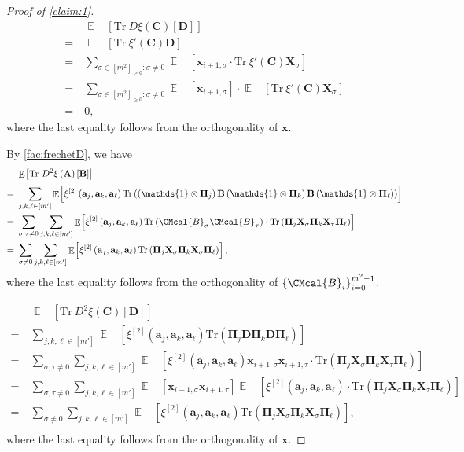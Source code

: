 \documentclass[11pt]{article}
\def\B{\CMcal{B}}
\theoremstyle{plain}
\theoremstyle{definition}
\newcommand {\minusspace} {\: \! \!}
\newcommand {\Fn} [2] {\ensuremath{ #1 \minusspace \Br{ #2 } }}
\newcommand {\set} [1] {\ensuremath{ \left\lbrace #1 \right\rbrace }}
\newcommand {\br} [1] {\ensuremath{ \left( #1 \right) }}
\newcommand {\Br} [1] {\ensuremath{ \left[ #1 \right] }}
\DeclareMathOperator*{\bigE}{\mathbb{E}}
\newcommand {\expec} [2] {\Fn{\bigE_{\substack{#1}}}{#2}}
\newcommand {\Tr} {\ensuremath{ \mathrm{Tr} }}
\newcommand {\id} {\ensuremath{\mathds{1}}}
\newcommand{\randx}{\ensuremath{\mathbf{x}}}
\newcommand{\randB}{\ensuremath{\mathbf{B}}}
\newcommand{\randC}{\ensuremath{\mathbf{C}}}
\newcommand{\randD}{\ensuremath{\mathbf{D}}}
\newcommand{\randa}{\ensuremath{\mathbf{a}}}
\newcommand{\randPi}{\ensuremath{\mathbf{\Pi}}}
\newcommand{\1}{\mathbb{1}} %
\begin{document}
\begin{proof}[Proof of \cref{claim:1}]
\begin{align*}
&\expec{}{\Tr~D\xi\br{\mathbf{C}}\Br{\mathbf{D}}}\\
=~&\expec{}{\Tr~\xi'\br{\randC}\randD}\\
=~&\sum_{\sigma\in[m^2]_{\geq 0}:\sigma\neq 0}\expec{}{\randx_{i+1,\sigma}\cdot\Tr~\xi'\br{\randC}\mathbf{X}_{\sigma}}\\
=~&\sum_{\sigma\in[m^2]_{\geq 0}:\sigma\neq 0}\expec{}{\randx_{i+1,\sigma}}\cdot\expec{}{\Tr~\xi'\br{\randC}\mathbf{X}_{\sigma}}\\
=~&0,
\end{align*}
where the last equality follows from the orthogonality of $\randx$.


By \cref{fac:frechetD}, we have 
\begin{align*}
&\expec{}{\Tr~D^2\xi\br{\mathbf{A}}\Br{\mathbf{B}}}\\
=~&\sum_{j,k,\ell\in[m']}\expec{}{\xi^{[2]}\br{\randa_j,\randa_k,\randa_{\ell}}\Tr\br{\br{\id\otimes\randPi_{j}}\randB\br{\id\otimes\randPi_{k}}\randB\br{\id\otimes\randPi_{\ell}}}}\\
=~&\sum_{\sigma,\tau\ne0}\sum_{j,k,\ell\in[m']}\expec{}{\xi^{[2]}\br{\randa_j,\randa_k,\randa_{\ell}}\Tr\br{\B_{\sigma}\B_{\tau}}\cdot\Tr\br{\randPi_{j}\mathbf{X}_{\sigma}\randPi_{k}\mathbf{X}_{\tau}\randPi_{\ell}}}\\
=~&\sum_{\sigma\ne0}\sum_{j,k,\ell\in[m']}\expec{}{\xi^{[2]}\br{\randa_j,\randa_k,\randa_{\ell}}\Tr\br{\randPi_{j}\mathbf{X}_{\sigma}\randPi_{k}\mathbf{X}_{\sigma}\randPi_{\ell}}},\\
\end{align*}
where the last equality follows from the orthogonality of $\set{\B_i}_{i=0}^{m^2-1}$.


\begin{align*}
&\expec{}{\Tr~D^2\xi\br{\mathbf{C}}\Br{\mathbf{D}}}\\
=~&\sum_{j,k,\ell\in[m']}\expec{}{\xi^{[2]}\br{\randa_j,\randa_k,\randa_{\ell}}\Tr\br{\randPi_{j}\randD\randPi_{k}\randD\randPi_{\ell}}}\\
=~&\sum_{\sigma,\tau\ne0}\sum_{j,k,\ell\in[m']}\expec{}{\xi^{[2]}\br{\randa_j,\randa_k,\randa_{\ell}}\randx_{i+1,\sigma}\randx_{i+1,\tau}\cdot\Tr\br{\randPi_{j}\mathbf{X}_{\sigma}\randPi_{k}\mathbf{X}_{\tau}\randPi_{\ell}}}\\
=~&\sum_{\sigma,\tau\ne0}\sum_{j,k,\ell\in[m']}\expec{}{\randx_{i+1,\sigma}\randx_{i+1,\tau}}\expec{}{\xi^{[2]}\br{\randa_j,\randa_k,\randa_{\ell}}\cdot\Tr\br{\randPi_{j}\mathbf{X}_{\sigma}\randPi_{k}\mathbf{X}_{\tau}\randPi_{\ell}}}\\
=~&\sum_{\sigma\ne0}\sum_{j,k,\ell\in[m']}\expec{}{\xi^{[2]}\br{\randa_j,\randa_k,\randa_{\ell}}\Tr\br{\randPi_{j}\mathbf{X}_{\sigma}\randPi_{k}\mathbf{X}_{\sigma}\randPi_{\ell}}},\\
\end{align*}
where the last equality follows from the orthogonality of $\randx$.
\end{proof}
\end{document}
